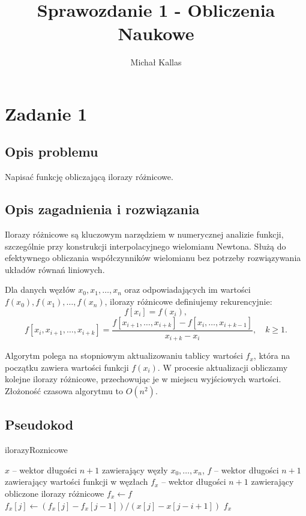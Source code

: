 \documentclass{article}
\title{Sprawozdanie 1 - Obliczenia Naukowe}
\author{Michał Kallas}
\begin{document}
\maketitle

\section{Zadanie 1}
\subsection{Opis problemu}
Napisać funkcję obliczającą ilorazy różnicowe.

\subsection{Opis zagadnienia i rozwiązania}

Ilorazy różnicowe są kluczowym narzędziem w numerycznej analizie funkcji, szczególnie przy konstrukcji interpolacyjnego wielomianu Newtona. Służą do efektywnego obliczania współczynników wielomianu bez potrzeby rozwiązywania układów równań liniowych. 

Dla danych węzłów \(x_0, x_1, \dots, x_n\) oraz odpowiadających im wartości \(f(x_0), f(x_1), \dots, f(x_n)\), ilorazy różnicowe definiujemy rekurencyjnie:
\[
f[x_i] = f(x_i),
\]
\[
f[x_i, x_{i+1}, \dots, x_{i+k}] = \frac{f[x_{i+1}, \dots, x_{i+k}] - f[x_i, \dots, x_{i+k-1}]}{x_{i+k} - x_i}, \quad k \geq 1.
\]

Algorytm polega na stopniowym aktualizowaniu tablicy wartości \(f_x\), która na początku zawiera wartości funkcji \(f(x_i)\).
W procesie aktualizacji obliczamy kolejne ilorazy różnicowe, przechowując je w miejscu wyjściowych wartości.
Złożoność czasowa algorytmu to \( O(n^2) \).

\subsection{Pseudokod}
\begin{algorithm}[H]
\caption{ilorazyRoznicowe}
\begin{algorithmic}[1]
\Require $x$ -- wektor długości $n + 1$ zawierający węzły $x_0, \dots, x_n$, $f$ -- wektor długości $n + 1$ zawierający wartości funkcji w węzłach
\Ensure $f_x$ -- wektor długości $n + 1$ zawierający obliczone ilorazy różnicowe
\State $f_x \gets f$
        \State $f_x[j] \gets (f_x[j] - f_x[j-1]) / (x[j] - x[j-i+1])$
    \EndFor
\EndFor
\State \Return $f_x$
\end{algorithmic}
\end{algorithm}
\end{document}
